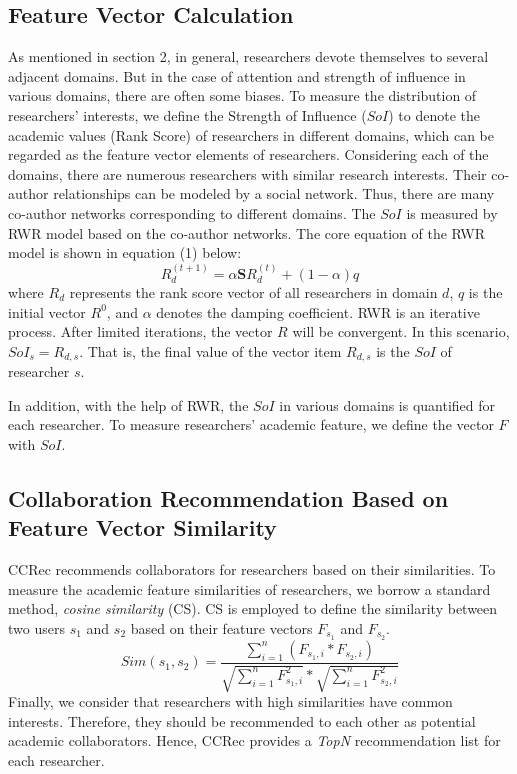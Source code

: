 \documentclass[10pt]{article}
\begin{document}
\subsection*{Feature Vector Calculation}
As mentioned in section 2, in general, researchers devote themselves to several adjacent domains. But in the case of attention and strength of influence in various domains, there are often some biases. To measure the distribution of researchers' interests, we define the Strength of Influence ($SoI$) to denote the academic values (Rank Score) of researchers in different domains, which can be regarded as the feature vector elements of researchers. Considering each of the domains, there are numerous researchers with similar research interests. Their co-author relationships can be modeled by a social network. Thus, there are many co-author networks corresponding to different domains. The $SoI$ is measured by RWR model based on the co-author networks. The core equation of the RWR model is shown in equation (1) below:
\begin{equation}
R_{d}^{(t+1)}=\alpha \mathbf{S}R_{d}^{(t)}+(1-\alpha)q
\end{equation}
where $R_{d}$ represents the rank score vector of all researchers in domain $d$, $q$ is the initial vector $R^0$, and $\alpha$ denotes the damping coefficient. RWR is an iterative process. After limited iterations, the vector $R$ will be convergent. In this scenario, $SoI_{s}=R_{d,s}$. That is, the final value of the vector item $R_{d,s}$ is the $SoI$ of researcher $s$.

In addition, with the help of RWR, the $SoI$ in various domains is quantified for each researcher. To measure researchers' academic feature, we define the vector $F$ with $SoI$.


\subsection*{Collaboration Recommendation Based on Feature Vector Similarity}
CCRec recommends collaborators for researchers based on their similarities. To measure the academic feature similarities of researchers, we borrow a standard method, \emph{cosine similarity} (CS). CS is employed to define the similarity between two users $s_{1}$ and $s_{2}$ based on their feature vectors $F_{s_{1}}$ and $F_{s_{2}}$.
\begin{equation}
Sim(s_{1},s_{2})=\frac{\sum_{i=1}^{n}(F_{s_{1},i}*F_{s_{2},i})}{\sqrt{\sum_{i=1}^{n}F_{s_{1},i}^2}*\sqrt{\sum_{i=1}^{n}F_{s_{2},i}^2}}
\end{equation}
Finally, we consider that researchers with high similarities have common interests. Therefore, they should be recommended to each other as potential academic collaborators. Hence, CCRec provides a \emph{TopN} recommendation list for each researcher.
\end{document}
